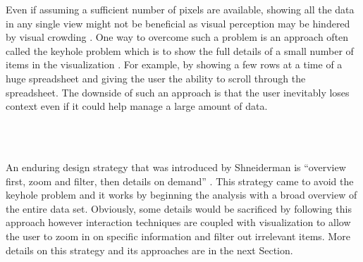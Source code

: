 Even if assuming a sufficient number of pixels are available, showing all the data in any single view might not be beneficial as visual perception may be hindered by visual crowding \cite{wolfe2015sensation}. One way to overcome such a problem is an approach often called the keyhole problem which is to show the full details of a small number of items in the visualization \cite{salvendy2012handbook}. For example, by showing a few rows at a time of a huge spreadsheet and giving the user the ability to scroll through the spreadsheet. The downside of such an approach is that the user inevitably loses context even if it could help manage a large amount of data.

\\\

 An enduring design strategy that was introduced by Shneiderman is “overview first, zoom and filter, then details on demand” \cite{shneiderman2003eyes}. This strategy came to avoid the keyhole problem and it works by beginning the analysis with a broad overview of the entire data set. Obviously, some details would be sacrificed by following this approach however interaction techniques are coupled with visualization to allow the user to zoom in on specific information and filter out irrelevant items. More details on this strategy and its approaches are in the next Section.

